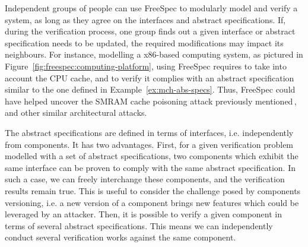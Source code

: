 Independent groups of people can use FreeSpec to modularly model and verify a
system, as long as they agree on the interfaces and abstract specifications.
%
If, during the verification process, one group finds out a given interface or
abstract specification needs to be updated, the required modifications may
impact its neighbours.
%
For instance, modelling a x86-based computing system, as pictured in
Figure~\ref{fig:freespec:computing-platform}, using FreeSpec requires to take
into account the CPU cache, and to verify it complies with an abstract
specification similar to the one defined in Example~\ref{ex:mch-abs-specs}.
%
Thus, FreeSpec could have helped uncover the SMRAM cache poisoning attack
previously mentioned\,\cite{wojtczuk2009smram,duflot2009smram}, and other
similar architectural attacks.

The abstract specifications are defined in terms of interfaces, i.e.
independently from components.
%
It has two advantages.
%
First, for a given verification problem modelled with a set of abstract
specifications, two components which exhibit the same interface can be proven to
comply with the same abstract specification.
%
In such a case, we can freely interchange these components, and the verification
results remain true.
%
This is useful to consider the challenge posed by components versioning, i.e. a
new version of a component brings new features which could be leveraged by an
attacker.
%
Then, it is possible to verify a given component in terms of several abstract
specifications.
%
This means we can independently conduct several verification works against the
same component.